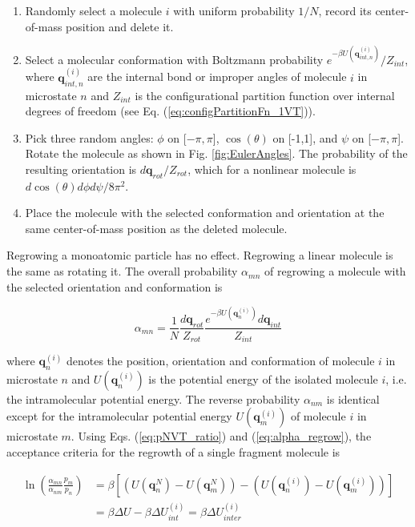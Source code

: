 \begin{enumerate}
	\item Randomly select a molecule $i$ with uniform probability $1/N$, record its center-of-mass position and delete it.
	\item Select a molecular conformation with Boltzmann probability $e^{-\beta U(\mathbf{q}_{int,n}^{(i)})}/Z_{int}$, where $\mathbf{q}_{int,n}^{(i)}$ are the internal bond or improper angles of molecule $i$ in microstate $n$ and $Z_{int}$ is the configurational partition function over internal degrees of freedom (see Eq. (\ref{eq:configPartitionFn_1VT})).
	\item Pick three random angles: $\phi$ on [$-\pi,\pi$], $\cos(\theta)$ on [-1,1], and $\psi$ on [$-\pi,\pi$]. Rotate the molecule as shown in Fig. \ref{fig:EulerAngles}. The probability of the resulting orientation is $d\mathbf{q}_{rot}/Z_{rot}$, which for a nonlinear molecule is $d\cos(\theta) d\phi d\psi / 8 \pi^2$.
	\item Place the molecule with the selected conformation and orientation at the same center-of-mass position as the deleted molecule.
\end{enumerate}

Regrowing a monoatomic particle has no effect. Regrowing a linear molecule is the same as rotating it. The overall probability $\alpha_{mn}$ of regrowing a molecule with the selected orientation and conformation is 

\begin{equation}
\label{eq:alpha_regrow}
\alpha_{mn} = \frac{1}{N} \frac{d\mathbf{q}_{rot}}{Z_{rot}} \frac{e^{-\beta U(\mathbf{q}_n^{(i)})}d\mathbf{q}_{int}}{Z_{int}}
\end{equation}

where $\mathbf{q}_n^{(i)}$ denotes the position, orientation and conformation of molecule $i$ in microstate $n$ and $U(\mathbf{q}_n^{(i)})$ is the potential energy of the isolated molecule $i$, i.e. the intramolecular potential energy. The reverse probability $\alpha_{nm}$ is identical except for the intramolecular potential energy $U(\mathbf{q}_m^{(i)})$ of molecule $i$ in microstate $m$. Using Eqs. (\ref{eq:pNVT_ratio}) and (\ref{eq:alpha_regrow}), the acceptance criteria for the regrowth of a single fragment molecule is

\begin{align}
\label{eq:pAcc_regrow}
\ln\left( \frac{\alpha_{mn}}{\alpha_{nm}} \frac{p_m}{p_n} \right) &= \beta \left[\left(U(\mathbf{q}^N_n) - U(\mathbf{q}^N_m)\right) - \left( U(\mathbf{q}_n^{(i)}) - U(\mathbf{q}_m^{(i)})\right)\right] \\ \nonumber
&= \beta \Delta U - \beta \Delta U_{int}^{(i)} = \beta \Delta U_{inter}^{(i)}
\end{align}

